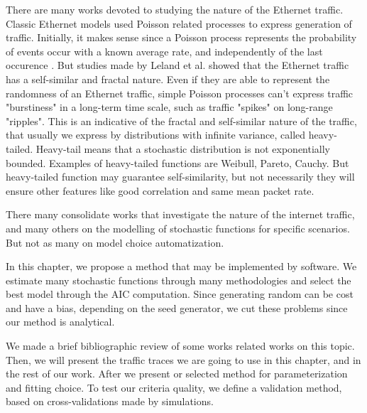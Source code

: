 There are many works devoted to studying the nature of the Ethernet traffic\cite{selfsimilar-ethernet}. Classic Ethernet models used Poisson related processes to express generation of traffic. Initially, it makes sense since a Poisson process represents the probability of events occur with a known average rate, and independently of the last occurence\cite{selfsimilar-ethernet} \cite{book-poisson}. But studies made by Leland et al.\cite{selfsimilar-ethernet} showed that the Ethernet traffic has a self-similar and fractal nature. Even if they are able to represent the randomness of an Ethernet traffic, simple Poisson processes can't express traffic "burstiness" in a long-term time scale, such as traffic "spikes" on long-range "ripples". This is an indicative of the fractal and self-similar nature of the traffic, that usually we express by distributions with infinite variance, called heavy-tailed. Heavy-tail means that a stochastic distribution is not exponentially bounded\cite{sourcesonoff-paper}. Examples of heavy-tailed functions are Weibull, Pareto, Cauchy.  But heavy-tailed function may guarantee self-similarity, but not necessarily they will ensure other features like good correlation and same mean packet rate.

There many consolidate works that investigate the nature of the internet traffic\cite{selfsimilar-ethernet}\cite{analysis-self-similar}\cite{stochartic-selfsimilar}\cite{selfsimilar-highvariability}\cite{multi-player-online-game-self-similarity}, and many others on the modelling of stochastic functions for specific scenarios\cite{estimation-renewal-function-ethernet-traffic}\cite{modelling-of-self-similar}\cite{empirical-interarrival-study}\cite{modeling-concurrent-heavy-tailed}\cite{optimal-scheduling-of-heavy-tailed-traffic}\cite{modelling-of-self-similar}. But not as many on model choice automatization\cite{sourcesonoff-paper}.

In this chapter, we propose a method that may be implemented by  software. We estimate many stochastic functions through many methodologies and select the best model through the AIC computation\cite{bic-aic-comparision}. Since generating random can be cost and have a bias, depending on the seed generator, we cut these problems since our method is analytical. 

We made a brief bibliographic review of some works related works on this topic. Then, we will present the traffic traces we are going to use in this chapter, and in the rest of our work. After we present or selected method for parameterization and fitting choice. To test our criteria quality, we define a validation method, based on cross-validations made by simulations.

